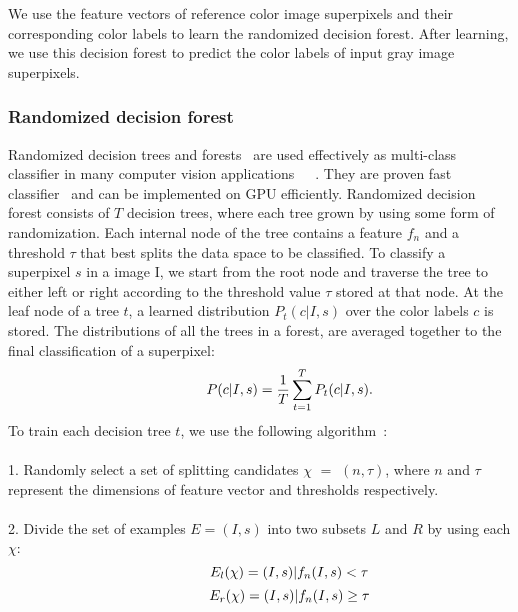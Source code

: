 \documentclass[twocolumn]{svjour3}          %
\begin{document}
We use the feature vectors of reference color image superpixels and their corresponding color labels to learn the randomized decision forest. After learning, we use this decision forest to predict the color labels of input gray image superpixels.

\subsubsection{Randomized decision forest}
Randomized decision trees and forests~\cite{Leo01} are used effectively as multi-class classifier in many computer vision applications~\cite{Anna07}~\cite{Gang11}~\cite{Shotton11}. They are proven fast classifier~\cite{Toby08} and can be implemented on GPU efficiently. Randomized decision forest consists of $T$ decision trees, where each tree grown by using some form of randomization. Each internal node of the tree contains a feature $f_{n}$ and a threshold $\tau$ that best splits the data space to be classified. To classify a superpixel $s$ in a image I, we start from the root node and traverse the tree to either left or right according to the threshold value $\tau$ stored at that node. At the leaf node of a tree $t$, a learned distribution $P_{t}(c|I, s)$ over the color labels $c$ is stored. The distributions of all the trees in a forest, are averaged together to the final classification of a superpixel:
\begin{equation}
\hspace{15mm} P(c|I, s) = \frac{1}{T}\sum_{t=1}^{T}{P_{t}(c|I, s)}.
\end{equation}
To train each decision tree $t$, we use the following algorithm~\cite{Shotton11}:\\\\
1. Randomly select a set of splitting candidates $\chi$ $=$ $(n, \tau)$, where $n$ and $\tau$ represent the dimensions of feature vector and thresholds respectively.\\\vspace{-2.5mm}\\
2. Divide the set of examples $E = {(I, s)}$ into two subsets $L$ and $R$ by using each $\chi$:
\begin{equation}
\hspace{15mm} E_{l}(\chi) = {(I, s)|f_{n}(I, s) < \tau}
\end{equation}
\begin{equation}
\hspace{15mm} E_{r}(\chi) = {(I, s)|f_{n}(I, s) \geq \tau}
\end{equation}
\end{document}
